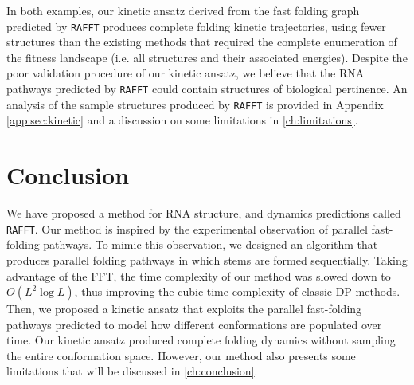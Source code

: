 In both examples, our kinetic ansatz derived from the fast folding graph predicted by \texttt{RAFFT} produces complete folding kinetic trajectories, using fewer structures than the existing methods that required the complete enumeration of the fitness landscape (i.e. all structures and their associated energies). Despite the poor validation procedure of our kinetic ansatz, we believe that the \ac{RNA} pathways predicted by \texttt{RAFFT} could contain structures of biological pertinence. An analysis of the sample structures produced by \texttt{RAFFT} is provided in Appendix \autoref{app:sec:kinetic} and a discussion on some limitations in \autoref{ch:limitations}.

\section{Conclusion}
We have proposed a method for \ac{RNA} structure, and dynamics predictions called \texttt{RAFFT}. Our method is inspired by the experimental observation of parallel fast-folding pathways. To mimic this observation, we designed an algorithm that produces parallel folding pathways in which stems are formed sequentially. Taking advantage of the \ac{FFT}, the time complexity of our method was slowed down to $O(L^2\log L)$, thus improving the cubic time complexity of classic \ac{DP} methods. Then, we proposed a kinetic ansatz that exploits the parallel fast-folding pathways predicted to model how different conformations are populated over time. Our kinetic ansatz produced complete folding dynamics without sampling the entire conformation space. However, our method also presents some limitations that will be discussed in \autoref{ch:conclusion}.
